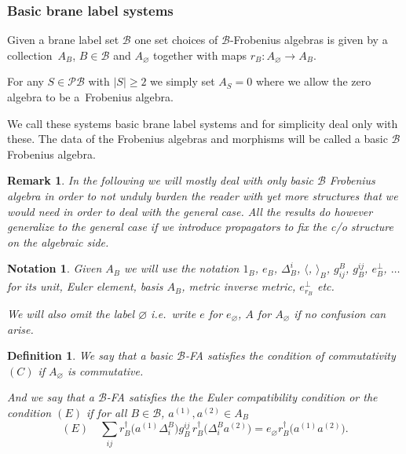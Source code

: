 \documentclass[pdftex]{sigma}
\newtheorem{df}[thm]{Definition}
\newtheorem{rmk}[thm]{Remark}
\newtheorem{nota}[thm]{Notation}
\def\calB{{\mathcal B}}
\def\calP{{\mathcal P}}
\def\la{\langle}
\def\ra{\rangle}
\def\res{r}
\begin{document}
\subsubsection{Basic brane label systems}
Given a  brane label set $\calB$ one set choices of $\calB$-Frobenius algebras is given by
a collection~$A_B$, $B\in \calB$ and $A_{\varnothing}$ together with maps $r_B:A_{\varnothing}\to A_B$.

For any $S\in \calP\calB$ with $|S|\geq 2$ we simply set $A_S=0$ where
we allow the zero algebra to be a~Frobenius algebra.

We call these systems basic brane label systems and for simplicity deal only with these.
The data of the Frobenius algebras and morphisms will be called a basic $\calB$ Frobenius algebra.

\begin{rmk}
In the following we will mostly deal with only basic $\calB$ Frobenius algebra in order to not unduly
burden the  reader with yet more  structures that we would need in order to deal with the general case.
All the results do however generalize to the general case if we introduce propagators to f\/ix the
c/o structure on the algebraic side.
\end{rmk}

\begin{nota}
Given $A_B$ we will use the notation
$1_B$, $e_B$, $\Delta^i_B$, $\la$, $\ra_B$, $g^B_{ij}$, $g^{ij}_B$, $e^{\perp}_B$,
$\dots$ for its unit, Euler element,
basis $A_B$, metric inverse metric, $e^{\perp}_{r_B}$ etc.

We will also omit the label ${\varnothing}$ i.e.\ write  $e$ for $e_{\varnothing}$, $A$ for $A_{\varnothing}$ if no
confusion can arise.
\end{nota}



\begin{df}
\label{Eulerdef}
We say that a basic $\calB$-FA  satisf\/ies the condition of commutativity $(C)$ if $A_{\varnothing}$ is commutative.

And we say that a $\calB$-FA satisf\/ies the
the Euler compatibility condition or the {\em condition $(E)$} if for all $B\in \calB$, $a^{(1)},a^{(2)}\in A_B$
\begin{equation*}
(E) \quad \sum_{ij}\res_B^{\dagger}\big(a^{(1)}\Delta^B_i\big) g^{ij}_B
 \,  \res_B^{\dagger}\big(\Delta^B_ia^{(2)}\big)=e_{\varnothing}\res_B^{\dagger}\big(a^{(1)}a^{(2)}\big).
\end{equation*}
\end{df}
\end{document}
